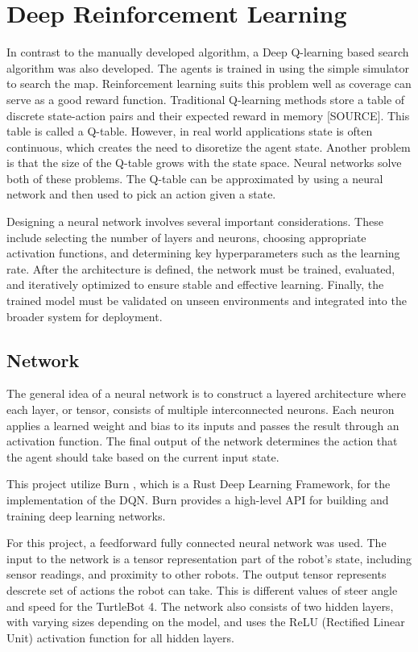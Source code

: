 \section{Deep Reinforcement Learning}
\label{sec:rl}
In contrast to the manually developed algorithm, a Deep Q-learning based search algorithm was also developed. The agents is trained in using the simple simulator to search the map. Reinforcement learning suits this problem well as coverage can serve as a {\color{red} good} reward function. Traditional Q-learning methods store a table of discrete state-action pairs and their expected reward in memory {\color{red}[SOURCE]}. This table is called a Q-table. However, in real world applications state is often continuous, which creates the need to {\color{red} disoretize} the agent state. Another problem is that the size of the Q-table grows with the state space. Neural networks solve both of these problems. The Q-table can be approximated by using a neural network and then used to pick an action given a state.

Designing a neural network involves several important considerations. These include selecting the number of layers and neurons, choosing appropriate activation functions, and determining key hyperparameters such as the learning rate. After the architecture is defined, the network must be trained, evaluated, and iteratively optimized to ensure stable and effective learning. Finally, the trained model must be validated on unseen environments and integrated into the broader system for deployment.

\subsection{Network}
The general idea of a neural network is to construct a layered architecture where each layer, or tensor, consists of multiple interconnected neurons. Each neuron applies a learned weight and bias to its inputs and passes the result through an activation function. The final output of the network determines the action that the agent should take based on the current input state.

This project utilize Burn \cite{burn}, which is a Rust Deep Learning Framework, for the implementation of the DQN. Burn provides a high-level API for building and training deep learning networks.

For this project, a feedforward fully connected neural network was used. The input to the network is a tensor representation part of the robot’s state, including sensor readings, and proximity to other robots. 
The output tensor represents descrete set of actions the robot can take. This is different values of steer angle and speed for the TurtleBot 4.
The network also consists of two hidden layers, with varying sizes depending on the model, and uses the ReLU (Rectified Linear Unit) activation function for all hidden layers.

